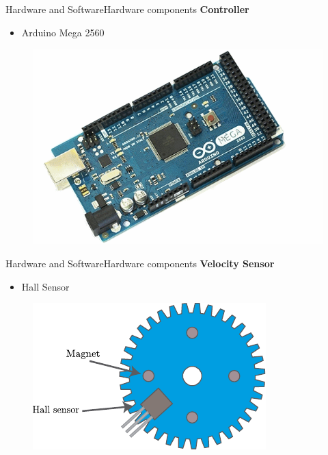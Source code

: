 \begin{frame}{Hardware and Software}{Hardware components}
\textbf{Controller}
\begin{itemize}
\item{Arduino Mega 2560}
\end{itemize}
  \begin{figure}[H]
	\centering
	\includegraphics[scale=0.4]{Pictures/ArduinoMega.png}
  \end{figure}
\end{frame}

\begin{frame}{Hardware and Software}{Hardware components}
\textbf{Velocity Sensor}
\begin{itemize}
\item{Hall Sensor}
\end{itemize}
  \begin{figure}[H]
	\centering
	\includegraphics[scale=1.5]{Pictures/hallSensorDrawing.pdf}
  \end{figure}
\end{frame}

